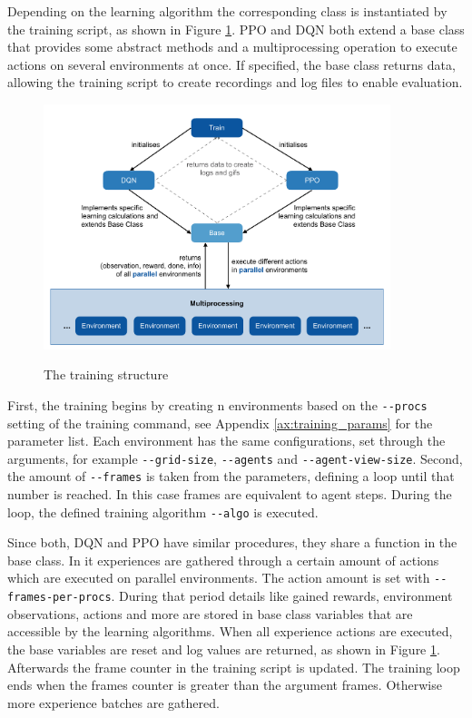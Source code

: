 Depending on the learning algorithm the corresponding class is instantiated by the training script, as shown in Figure \ref{fig:training}. PPO and DQN both extend a base class that provides some abstract methods and a multiprocessing operation to execute actions on several environments at once. If specified, the base class returns data, allowing the training script to create recordings and log files to enable evaluation.

\begin{figure}[hpbt]
    \centering
    \includegraphics[width=0.9\textwidth]{pictures/training}\\
    \caption[The training structure]{The training structure}\label{fig:training}
\end{figure}

First, the training begins by creating n environments based on the \verb|--procs| setting of the training command, see Appendix \ref{ax:training_params} for the parameter list. Each environment has the same configurations, set through the arguments, for example \verb|--grid-size|, \verb|--agents| and \verb|--agent-view-size|. Second, the amount of \verb|--frames| is taken from the parameters, defining a loop until that number is reached. In this case frames are equivalent to agent steps. During the loop, the defined training algorithm \verb|--algo| is executed.

Since both, DQN and PPO have similar procedures, they share a function in the base class. In it experiences are gathered through a certain amount of actions which are executed on parallel environments. The action amount is set with \verb|--frames-per-procs|. During that period details like gained rewards, environment observations, actions and more are stored in base class variables that are accessible by the learning algorithms. When all experience actions are executed, the base variables are reset and log values are returned, as shown in Figure \ref{fig:training}. Afterwards the frame counter in the training script is updated. The training loop ends when the frames counter is greater than the argument frames. Otherwise more experience batches are gathered.

